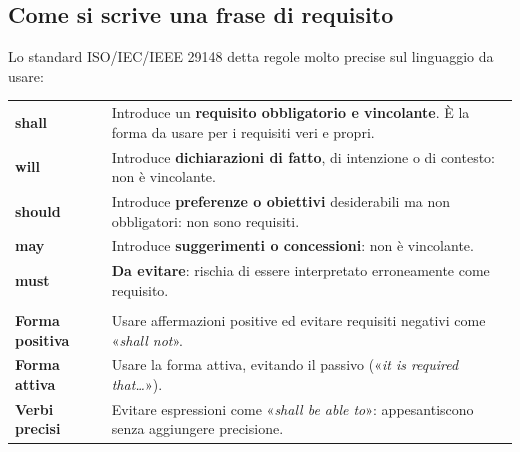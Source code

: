 \subsection{Come si scrive una frase di requisito}

Lo standard ISO/IEC/IEEE 29148 detta regole molto precise sul linguaggio da usare:

\begin{table}[H]
\centering
\renewcommand{\arraystretch}{1.4}
\begin{tabularx}{\textwidth}{>{\bfseries\leavevmode\color{ph1}}P{2.6cm} L}
\toprule
shall & Introduce un \textbf{requisito obbligatorio e vincolante}. È la forma da usare per i requisiti veri e propri. \\
will & Introduce \textbf{dichiarazioni di fatto}, di intenzione o di contesto: non è vincolante. \\
should & Introduce \textbf{preferenze o obiettivi} desiderabili ma non obbligatori: non sono requisiti. \\
may & Introduce \textbf{suggerimenti o concessioni}: non è vincolante. \\
must & \textbf{Da evitare}: rischia di essere interpretato erroneamente come requisito. \\
\midrule
{} \\
\midrule
Forma positiva & Usare affermazioni positive ed evitare requisiti negativi come «\textit{shall not}». \\
Forma attiva & Usare la forma attiva, evitando il passivo («\textit{it is required that\ldots}»). \\
Verbi precisi & Evitare espressioni come «\textit{shall be able to}»: appesantiscono senza aggiungere precisione. \\
\bottomrule
\end{tabularx}
\end{table}

